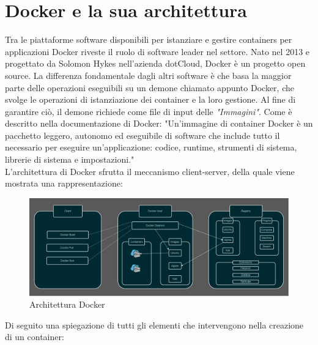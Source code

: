 \newpage

\section{Docker e la sua architettura}

Tra le piattaforme software disponibili per istanziare e gestire containers per applicazioni Docker riveste il ruolo di software leader nel settore.
Nato nel 2013 e progettato da Solomon Hykes nell'azienda dotCloud, Docker è un progetto open source. La differenza fondamentale dagli altri software è che
basa la maggior parte delle operazioni eseguibili su un demone chiamato appunto Docker, che svolge le operazioni di istanziazione dei container e la loro gestione.
Al fine di garantire ciò, il demone richiede come file di input delle \textit{"Immagini"}. Come è descritto nella documentazione di Docker\cite{docker-container}: 
"Un'immagine di container Docker è un pacchetto leggero, autonomo ed eseguibile di software che include tutto il necessario per eseguire un'applicazione: codice, runtime, strumenti di sistema, librerie di sistema e impostazioni."\\

L'architettura di Docker sfrutta il meccanismo client-server, della quale viene mostrata una rappresentazione:\\

\begin{figure}[h]  %
    \centering
    \includegraphics[width=1\textwidth]{images/Docker_Architecture.png}  %
    \caption{Architettura Docker}
    \label{fig:DockerArchitecture}
\end{figure}

Di seguito una spiegazione di tutti gli elementi che intervengono nella creazione di un container:

